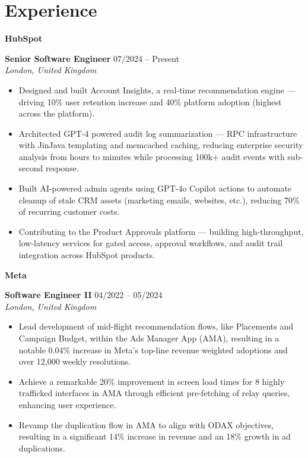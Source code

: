 \documentclass[a4paper,10pt]{article}
\newcommand{\company}[1]{{\normalsize\textbf{\color{primarycolor}#1}}}
\newcommand{\role}[1]{{\small\textbf{#1}}}
\newlength{\rightcolwidth}
\begin{document}
\begin{minipage}[t]{\rightcolwidth}
\section*{Experience}

\company{HubSpot}

\role{Senior Software Engineer} \hfill 07/2024 -- Present\\
\small\textit{London, United Kingdom}

\begin{itemize}[leftmargin=*,itemsep=0.3em]
    \small
    \item Designed and built Account Insights, a real-time recommendation engine — driving 10\% user retention increase and 40\% platform adoption (highest across the platform).
    \item Architected GPT-4 powered audit log summarization — RPC infrastructure with JinJava templating and memcached caching, reducing enterprise security analysis from hours to minutes while processing 100k+ audit events with sub-second response.
    \item Built AI-powered admin agents using GPT-4o Copilot actions to automate cleanup of stale CRM assets (marketing emails, websites, etc.), reducing 70\% of recurring customer costs.
    \item Contributing to the Product Approvals platform --- building high-throughput, low-latency services for gated access, approval workflows, and audit trail integration across HubSpot products.
\end{itemize}

\vspace{0.5em}
\company{Meta}

\role{Software Engineer II} \hfill 04/2022 -- 05/2024\\
\small\textit{London, United Kingdom}

\begin{itemize}[leftmargin=*,itemsep=0.3em]
    \small
    \item Lead development of mid-flight recommendation flows, like Placements and Campaign Budget, within the Ads Manager App (AMA), resulting in a notable 0.04\% increase in Meta's top-line revenue weighted adoptions and over 12{,}000 weekly resolutions.
    \item Achieve a remarkable 20\% improvement in screen load times for 8 highly trafficked interfaces in AMA through efficient pre-fetching of relay queries, enhancing user experience.
    \item Revamp the duplication flow in AMA to align with ODAX objectives, resulting in a significant 14\% increase in revenue and an 18\% growth in ad duplications.
\end{itemize}


\end{minipage}
\end{document}
